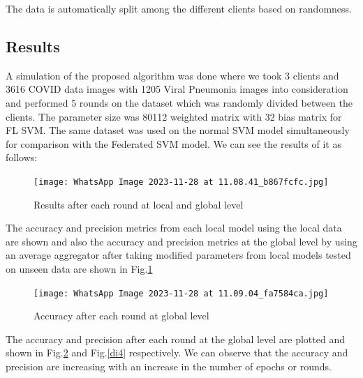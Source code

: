 \documentclass[conference]{IEEEtran}
\begin{document}
The data is automatically split among the different clients based on randomness.
\subsection{Results}

A simulation of the proposed algorithm was done where we took 3 clients and 3616 COVID data images with 1205 Viral Pneumonia images into consideration and performed 5 rounds on the dataset which was randomly divided between the clients. The parameter size was 80112 weighted matrix with 32 bias matrix for FL SVM. The same dataset was used on the normal SVM model simultaneously for comparison with the Federated SVM model. 
We can see the results of it as follows:

\begin{figure}[htp]
    \centering
    \texttt{[image: WhatsApp Image 2023-11-28 at 11.08.41\_b867fcfc.jpg]}
    \caption{Results after each round at local and global level}
    \label{di2}
\end{figure}

The accuracy and precision metrics from each local model using the local data are shown and also the accuracy and precision metrics at the global level by using an average aggregator after taking modified parameters from local models tested on unseen data are shown in Fig.\ref{di2}

\begin{figure}[htp]
    \centering
    \texttt{[image: WhatsApp Image 2023-11-28 at 11.09.04\_fa7584ca.jpg]}
    \caption{Accuracy after each round at global level}
    \label{di3}
\end{figure}

The accuracy and precision after each round at the global level are plotted and shown in Fig.\ref{di3} and Fig.\ref{di4} respectively. We can observe that the accuracy and precision are increasing with an increase in the number of epochs or rounds.
    
\end{document}
